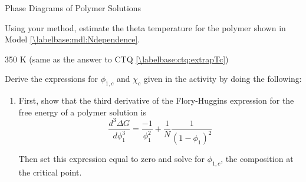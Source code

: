\begin{activity}{Phase Diagrams of Polymer Solutions}
\begin{ctqs}
	\question Using your method, estimate the theta temperature for the polymer shown in Model \ref{\labelbase:mdl:Ndependence}.
	
		\begin{solution}[0.5in]{}
			350 K (same as the answer to CTQ \ref{\labelbase:ctq:extrapTc})
		\end{solution} 

\end{ctqs}



\begin{exercises}

	\exercise Derive the expressions for $\phi_{1,c}$ and $\chi_c$ given in the activity by doing the following:
		\label{\labelbase:exc:critpt}
	
		\begin{enumerate}
	
			\item First, show that the third derivative of the Flory-Huggins expression for the free energy of a polymer solution is
				\begin{equation*}
					\frac{d^3\Delta G}{d\phi_1^3} = \frac{-1}{\phi_1^2} + \frac{1}{N}\frac{1}{(1-\phi_1)^2}
				\end{equation*}
		
				Then set this expression equal to zero and solve for $\phi_{1,c}$, the composition at the critical point.
			

\end{enumerate}
\end{exercises}
\end{activity}
